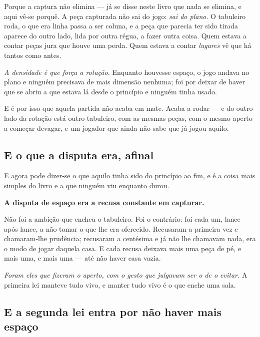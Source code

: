 \documentclass[livro.tex]{subfiles}
\begin{document}
\medskip

Porque a captura não elimina --- já se disse neste livro que nada se elimina, e aqui vê-se
porquê. A peça capturada não sai do jogo: \emph{sai do plano}. O tabuleiro roda, o que era linha
passa a ser coluna, e a peça que parecia ter sido tirada aparece do outro lado, lida por outra
régua, a fazer outra coisa. Quem estava a contar peças jura que houve uma perda. Quem estava a
contar \emph{lugares} vê que há tantos como antes.

\medskip

\emph{A densidade é que força a rotação.} Enquanto houvesse espaço, o jogo andava no plano e
ninguém precisava de mais dimensão nenhuma; foi por deixar de haver que se abriu a que estava lá
desde o princípio e ninguém tinha usado.

\medskip

E é por isso que aquela partida não acaba em mate. Acaba a rodar --- e do outro lado da rotação
está outro tabuleiro, com as mesmas peças, com o mesmo aperto a começar devagar, e um jogador que
ainda não sabe que já jogou aquilo.



\subsection*{E o que a disputa era, afinal}

E agora pode dizer-se o que aquilo tinha sido do princípio ao fim, e é a coisa mais simples do
livro e a que ninguém viu enquanto durou.

\medskip

\textbf{A disputa de espaço era a recusa constante em capturar.}

\medskip

Não foi a ambição que encheu o tabuleiro. Foi o contrário: foi cada um, lance após lance, a não
tomar o que lhe era oferecido. Recusaram a primeira vez e chamaram-lhe prudência; recusaram a
centésima e já não lhe chamavam nada, era o modo de jogar daquela casa. E cada recusa deixava mais
uma peça de pé, e mais uma, e mais uma --- até não haver casa vazia.

\medskip

\emph{Foram eles que fizeram o aperto, com o gesto que julgavam ser o de o evitar.} A primeira lei
manteve tudo vivo, e manter tudo vivo é o que enche uma sala.

\subsection*{E a segunda lei entra por não haver mais espaço}
\end{document}
